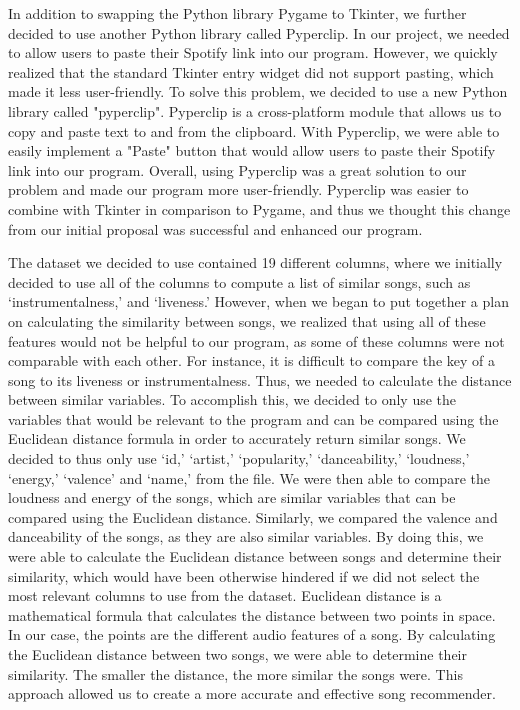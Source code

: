 \documentclass[fontsize=11pt]{article}
\begin{document}
\begin{enumerate}
In addition to swapping the Python library Pygame to Tkinter, we further decided to use another Python library called Pyperclip. In our project, we needed to allow users to paste their Spotify link into our program. However, we quickly realized that the standard Tkinter entry widget did not support pasting, which made it less user-friendly. To solve this problem, we decided to use a new Python library called "pyperclip". Pyperclip is a cross-platform module that allows us to copy and paste text to and from the clipboard. With Pyperclip, we were able to easily implement a "Paste" button that would allow users to paste their Spotify link into our program. Overall, using Pyperclip was a great solution to our problem and made our program more user-friendly. Pyperclip was easier to combine with Tkinter in comparison to Pygame, and thus we thought this change from our initial proposal was successful and enhanced our program. \newline

The dataset we decided to use contained 19 different columns, where we initially decided to use all of the columns to compute a list of similar songs, such as ‘instrumentalness,’ and ‘liveness.’ However, when we began to put together a plan on calculating the similarity between songs, we realized that using all of these features would not be helpful to our program, as some of these columns were not comparable with each other. For instance, it is difficult to compare the key of a song to its liveness or instrumentalness. Thus, we needed to calculate the distance between similar variables. To accomplish this, we decided to only use the variables that would be relevant to the program and can be compared using the Euclidean distance formula in order to accurately return similar songs. We decided to thus only use ‘id,’ ‘artist,’ ‘popularity,’ ‘danceability,’ ‘loudness,’ ‘energy,’ ‘valence’ and ‘name,’ from the file. We were then able to compare the loudness and energy of the songs, which are similar variables that can be compared using the Euclidean distance. Similarly, we compared the valence and danceability of the songs, as they are also similar variables. By doing this, we were able to calculate the Euclidean distance between songs and determine their similarity, which would have been otherwise hindered if we did not select the most relevant columns to use from the dataset. Euclidean distance is a mathematical formula that calculates the distance between two points in space. In our case, the points are the different audio features of a song. By calculating the Euclidean distance between two songs, we were able to determine their similarity. The smaller the distance, the more similar the songs were. This approach allowed us to create a more accurate and effective song recommender. \newline


\end{enumerate}
\end{document}
